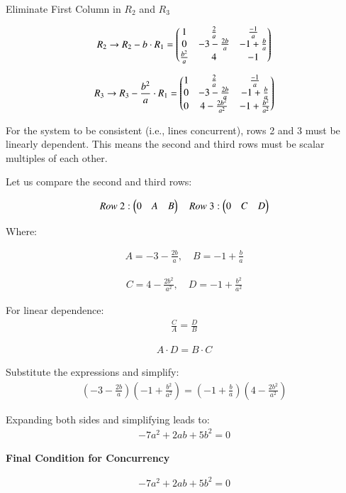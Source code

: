\documentclass{beamer}
\begin{document}
\begin{frame}
Eliminate First Column in $R_2$ and $R_3$

\begin{align}
R_2 \rightarrow R_2 - b \cdot R_1 = 
\begin{pmatrix}
1 & \frac{2}{a} & \frac{-1}{a} \\
0 & -3 - \frac{2b}{a} & -1 + \frac{b}{a} \\
\frac{b^2}{a} & 4 & -1
\end{pmatrix}
\end{align}

\begin{align}
R_3 \rightarrow R_3 - \frac{b^2}{a} \cdot R_1 = 
\begin{pmatrix}
1 & \frac{2}{a} & \frac{-1}{a} \\
0 & -3 - \frac{2b}{a} & -1 + \frac{b}{a} \\
0 & 4 - \frac{2b^2}{a^2} & -1 + \frac{b^2}{a^2}
\end{pmatrix}
\end{align}
\end{frame}

\begin{frame}
For the system to be consistent (i.e., lines concurrent), rows 2 and 3 must be linearly dependent. This means the second and third rows must be scalar multiples of each other.

Let us compare the second and third rows:

\begin{align}
Row\ 2: \begin{pmatrix}0 \quad A \quad B\end{pmatrix} \quad
Row\ 3: \begin{pmatrix}0 \quad C \quad D\end{pmatrix}
\end{align}

Where:

\begin{align}
A = -3 - \frac{2b}{a}, \quad B = -1 + \frac{b}{a}
\end{align}

\begin{align}
C = 4 - \frac{2b^2}{a^2}, \quad D = -1 + \frac{b^2}{a^2}
\end{align}
\end{frame}

\begin{frame}
For linear dependence:
\begin{align}
\frac{C}{A} = \frac{D}{B}
\end{align}

\begin{align}
A \cdot D = B \cdot C
\end{align}

Substitute the expressions and simplify:
\begin{align}
\left(-3 - \frac{2b}{a}\right)\left(-1 + \frac{b^2}{a^2}\right) = 
\left(-1 + \frac{b}{a}\right)\left(4 - \frac{2b^2}{a^2}\right)
\end{align}
\end{frame}

\begin{frame}
Expanding both sides and simplifying leads to:
\begin{align}
-7a^2 + 2ab + 5b^2 = 0
\end{align}

\textbf{Final Condition for Concurrency}

\begin{align}
\boxed{-7a^2 + 2ab + 5b^2 = 0}
\end{align}
\end{frame}
\end{document}
